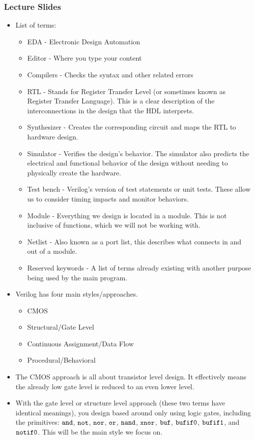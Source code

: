 \documentclass[10pt,a4paper]{article}
\begin{document}
\subsubsection{Lecture Slides}
\begin{itemize}
\item List of terms:
\begin{itemize}
\item EDA - Electronic Design Automation
\item Editor - Where you type your content
\item Compilers - Checks the syntax and other related errors
\item RTL - Stands for Register Transfer Level (or sometimes known as Register Transfer Language). This is a clear description of the interconnections in the design that the HDL interprets.
\item Synthesizer - Creates the corresponding circuit and maps the RTL to hardware design.
\item Simulator - Verifies the design's behavior. The simulator also predicts the electrical and functional behavior of the design without needing to physically create the hardware.
\item Test bench - Verilog's version of test statements or unit tests. These allow us to consider timing impacts and monitor behaviors. 
\item Module - Everything we design is located in a module. This is not inclusive of functions, which we will not be working with.
\item Netlist - Also known as a port list, this describes what connects in and out of a module.
\item Reserved keywords - A list of terms already existing with another purpose being used by the main program.
\end{itemize}
\item Verilog has four main styles/approaches.
\begin{itemize}
\item CMOS
\item Structural/Gate Level
\item Continuous Assignment/Data Flow
\item Procedural/Behavioral
\end{itemize}
\item The CMOS approach is all about transistor level design. It effectively means the already low gate level is reduced to an even lower level.
\item With the gate level or structure level approach (these two terms have identical meanings), you design based around only using logic gates, including the primitives: $\tt{and}$, $\tt{not}$, $\tt{nor}$, $\tt{or}$, $\tt{nand}$, $\tt{xnor}$, $\tt{buf}$, $\tt{bufif0}$, $\tt{bufif1}$, and $\tt{notif0}$. This will be the main style we focus on.

\end{itemize}
\end{document}

